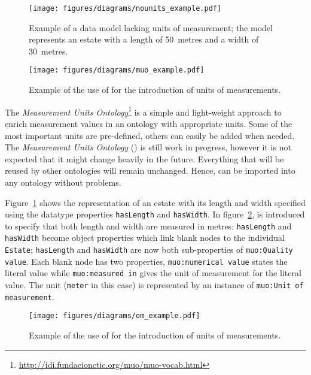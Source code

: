 \begin{figure}
\centering
\texttt{[image: figures/diagrams/nounits\_example.pdf]}
\caption{Example of a data model lacking units of measurement; the model represents an estate with a length of \SI{50}{metres} and a width of \SI{30}{metres}.}
\label{fig:nounits_example}
\end{figure}

\begin{figure}
\centering
\texttt{[image: figures/diagrams/muo\_example.pdf]}
\caption{Example of the use of \muo for the introduction of units of measurements.}
\label{fig:muo_example}
\end{figure}

The \emph{Measurement Units Ontology}\footnote{\href{http://idi.fundacionctic.org/muo/muo-vocab.html}{http://idi.fundacionctic.org/muo/muo-vocab.html}}\cite{MUO} is a simple and light-weight approach to enrich measurement values in an ontology with appropriate units. Some of the most important units are pre-defined, others can easily be added when needed. The \emph{Measurement Units Ontology} (\muo) is still work in progress, however it is not expected that it might change heavily in the future. Everything that will be reused by other ontologies will remain unchanged. Hence, \muo can be imported into any ontology without problems.

Figure~\ref{fig:nounits_example} shows the representation of an estate with its length and width specified using the datatype properties \texttt{hasLength} and \texttt{hasWidth}. In figure~\ref{fig:muo_example}, \muo is introduced to specify that both length and width are measured in metres: \texttt{hasLength} and \texttt{hasWidth} become object properties which link blank nodes to the individual \texttt{Estate}; \texttt{hasLength} and \texttt{hasWidth} are now both sub-properties of \texttt{muo:Quality value}. Each blank node has two properties, \texttt{muo:numerical value} states the literal value while \texttt{muo:measured in} gives the unit of measurement for the literal value. The unit (\texttt{meter} in this case) is represented by an instance of \texttt{muo:Unit of measurement}.

\begin{figure}
\centering
\texttt{[image: figures/diagrams/om\_example.pdf]}
\caption{Example of the use of  for the introduction of units of measurements.}
\label{fig:om_example}
\end{figure}

